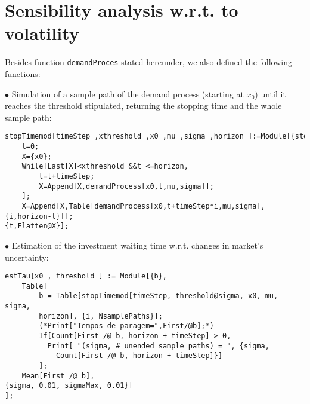 \section{Sensibility analysis w.r.t. to volatility}
\label{section:sav}

Besides function \texttt{demandProces} stated hereunder, we also defined the following functions:

\vspace{3mm}
$\bullet$ Simulation of a sample path of the demand process (starting at $x_0$) until it reaches the threshold stipulated, returning the stopping time and the whole sample path:
\begin{lstlisting}
stopTimemod[timeStep_,xthreshold_,x0_,mu_,sigma_,horizon_]:=Module[{stop,t,X},
	t=0;
	X={x0};
	While[Last[X]<xthreshold &&t <=horizon,
		t=t+timeStep;
		X=Append[X,demandProcess[x0,t,mu,sigma]];
	];
	X=Append[X,Table[demandProcess[x0,t+timeStep*i,mu,sigma],{i,horizon-t}]];
{t,Flatten@X}];
\end{lstlisting}


\vspace{3mm}
$\bullet$ Estimation of the investment waiting time w.r.t. changes in market's uncertainty:
\begin{lstlisting}
estTau[x0_, threshold_] := Module[{b},
	Table[
		b = Table[stopTimemod[timeStep, threshold@sigma, x0, mu, sigma,
		horizon], {i, NsamplePaths}];
		(*Print["Tempos de paragem=",First/@b];*)
		If[Count[First /@ b, horizon + timeStep] > 0,
		  Print[ "(sigma, # unended sample paths) = ", {sigma, 
		    Count[First /@ b, horizon + timeStep]}]
		];
	Mean[First /@ b],
{sigma, 0.01, sigmaMax, 0.01}]
];
\end{lstlisting}